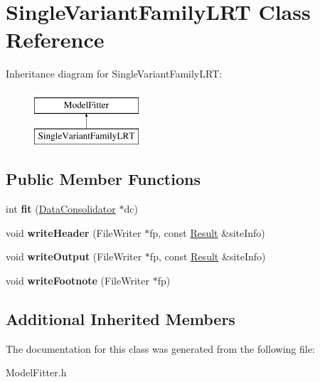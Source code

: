 \hypertarget{classSingleVariantFamilyLRT}{\section{Single\-Variant\-Family\-L\-R\-T Class Reference}
\label{classSingleVariantFamilyLRT}
}
Inheritance diagram for Single\-Variant\-Family\-L\-R\-T\-:\begin{figure}[H]
\begin{center}
\leavevmode
\includegraphics[height=2.000000cm]{classSingleVariantFamilyLRT}
\end{center}
\end{figure}
\subsection*{Public Member Functions}
\begin{DoxyCompactItemize}
\item 
\hypertarget{classSingleVariantFamilyLRT_a978f11d55a6efa641b8f6569510724bb}{int {\bfseries fit} (\hyperlink{classDataConsolidator}{Data\-Consolidator} $\ast$dc)}\label{classSingleVariantFamilyLRT_a978f11d55a6efa641b8f6569510724bb}

\item 
\hypertarget{classSingleVariantFamilyLRT_a388c6c566115b7f062d0d0d316a212b3}{void {\bfseries write\-Header} (File\-Writer $\ast$fp, const \hyperlink{classResult}{Result} \&site\-Info)}\label{classSingleVariantFamilyLRT_a388c6c566115b7f062d0d0d316a212b3}

\item 
\hypertarget{classSingleVariantFamilyLRT_a455598e22c24fe167ac332b689de6b3a}{void {\bfseries write\-Output} (File\-Writer $\ast$fp, const \hyperlink{classResult}{Result} \&site\-Info)}\label{classSingleVariantFamilyLRT_a455598e22c24fe167ac332b689de6b3a}

\item 
\hypertarget{classSingleVariantFamilyLRT_a7af5487044ce3a446cc8ce6b2b29171a}{void {\bfseries write\-Footnote} (File\-Writer $\ast$fp)}\label{classSingleVariantFamilyLRT_a7af5487044ce3a446cc8ce6b2b29171a}

\end{DoxyCompactItemize}
\subsection*{Additional Inherited Members}


The documentation for this class was generated from the following file\-:\begin{DoxyCompactItemize}
\item 
Model\-Fitter.\-h\end{DoxyCompactItemize}
